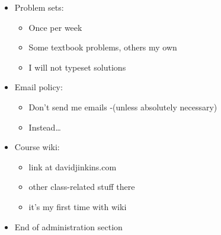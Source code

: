\documentclass[ignorenonframetext,]{beamer}
\begin{document}
\begin{frame}

\begin{itemize}
\itemsep1pt\parskip0pt
\item
  Problem sets:

  \begin{itemize}
  \itemsep1pt\parskip0pt
  \item
    Once per week
  \item
    Some textbook problems, others my own
  \item
    I will not typeset solutions
  \end{itemize}
\end{itemize}

\end{frame}

\begin{frame}

\begin{itemize}
\itemsep1pt\parskip0pt
\item
  Email policy:

  \begin{itemize}
  \itemsep1pt\parskip0pt
  \item
    Don't send me emails -(unless absolutely necessary)
  \item
    Instead\ldots
  \end{itemize}
\end{itemize}

\end{frame}

\begin{frame}

\begin{itemize}
\itemsep1pt\parskip0pt
\item
  Course wiki:

  \begin{itemize}
  \itemsep1pt\parskip0pt
  \item
    link at davidjinkins.com
  \item
    other class-related stuff there
  \item
    it's my first time with wiki
  \end{itemize}
\end{itemize}

\end{frame}

\begin{frame}

\begin{itemize}
\itemsep1pt\parskip0pt
\item
  End of administration section
\end{itemize}

\end{frame}
\end{document}
